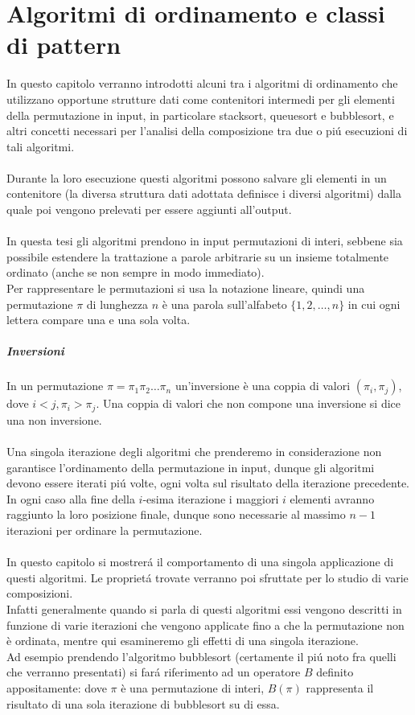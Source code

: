 \chapter{Algoritmi di ordinamento e classi di pattern}
In questo capitolo verranno introdotti alcuni tra i algoritmi di ordinamento che utilizzano opportune strutture dati come contenitori intermedi per gli elementi della permutazione in input, in particolare stacksort,
queuesort e bubblesort, e altri concetti necessari per l'analisi della composizione tra due o pi\'u esecuzioni di tali algoritmi.\\\\
Durante la loro esecuzione questi algoritmi possono salvare gli elementi in un contenitore (la diversa struttura dati adottata definisce i diversi algoritmi) dalla quale poi vengono prelevati per essere aggiunti all'output.\\\\
In questa tesi gli algoritmi prendono in input permutazioni di interi, sebbene sia possibile estendere la trattazione a parole arbitrarie su un insieme totalmente ordinato (anche se non sempre in modo immediato).\\
Per rappresentare le permutazioni si usa la notazione lineare, quindi una permutazione $\pi$ di lunghezza $n$ \`e una parola sull'alfabeto $\{1, 2, \dots, n\}$ in cui ogni lettera compare una e una sola volta.
\paragraph*{Inversioni} In un permutazione $\pi = \pi_1\pi_2\dots\pi_n$ un'inversione \`e una coppia di valori $(\pi_i,\pi_j)$, dove $i<j, \pi_i>\pi_j$. Una coppia di valori che non compone una inversione si dice una non inversione.\\
\\Una singola iterazione degli algoritmi che prenderemo in considerazione non garantisce l'ordinamento della permutazione in input,
dunque gli algoritmi devono essere iterati pi\'u volte, ogni volta sul risultato della iterazione precedente. In ogni caso alla fine della $i$-esima
iterazione i maggiori $i$ elementi avranno raggiunto la loro posizione finale, 
dunque sono necessarie al massimo $n-1$ iterazioni per ordinare la permutazione.\\\\
In questo capitolo si mostrer\'a il comportamento di una singola applicazione di questi algoritmi. Le propriet\'a trovate verranno poi sfruttate per lo studio di varie composizioni.\\
Infatti generalmente quando si parla di questi algoritmi essi vengono descritti in funzione di varie iterazioni che vengono applicate fino a che la permutazione non \`e ordinata, mentre qui esamineremo gli effetti di una singola iterazione.\\
Ad esempio prendendo l'algoritmo bubblesort (certamente il pi\'u noto fra quelli che verranno presentati) si far\'a riferimento ad un operatore $B$ definito appositamente: dove $\pi$ \`e una permutazione di
interi, $B(\pi)$ rappresenta il risultato di una sola iterazione di bubblesort su di essa.
